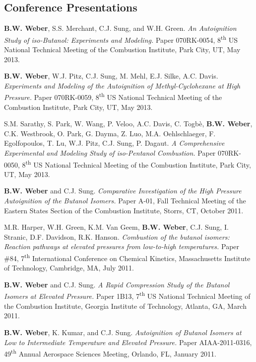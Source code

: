 \documentclass[margin,line]{res}
\newenvironment{list3}{
  \begin{list}{\ding{113}}{%
      \setlength{\itemsep}{0.1in}
      \setlength{\parsep}{0in} \setlength{\parskip}{0in}
      \setlength{\topsep}{0in} \setlength{\partopsep}{0in} 
      \setlength{\leftmargin}{0in}}}{\end{list}}
\begin{document}
\begin{resume}
\section{\sc Conference Presentations}
\begin{list3}
\item[] {\bf B.W. Weber}, S.S. Merchant, C.J. Sung, and W.H. Green. {\em An Autoignition Study of iso-Butanol: Experiments and Modeling.} Paper 070RK-0054, 8\textsuperscript{th} US National Technical Meeting of the Combustion Institute, Park City, UT, May 2013.
\item[] {\bf B.W. Weber}, W.J. Pitz, C.J. Sung, M. Mehl, E.J. Silke, A.C. Davis. {\em Experiments and Modeling of the Autoignition of Methyl-Cyclohexane at High Pressure.} Paper 070RK-0059, 8\textsuperscript{th} US National Technical Meeting of the Combustion Institute, Park City, UT, May 2013.
\item[] S.M. Sarathy, S. Park, W. Wang, P. Veloo, A.C. Davis, C. Togb\`{e}, {\bf B.W. Weber}, C.K. Westbrook, O. Park, G. Dayma, Z. Luo, M.A. Oehlschlaeger, F. Egolfopoulos, T. Lu, W.J. Pitz, C.J. Sung, P. Dagaut. {\em A Comprehensive Experimental and Modeling Study of iso-Pentanol Combustion.} Paper 070RK-0050, 8\textsuperscript{th} US National Technical Meeting of the Combustion Institute, Park City, UT, May 2013.
\item[] {\bf B.W. Weber} and C.J. Sung. {\em Comparative Investigation of the High Pressure Autoignition of the Butanol Isomers.} Paper A-01, Fall Technical Meeting of the Eastern States Section of the Combustion Institute, Storrs, CT, October 2011.
\item[] M.R. Harper, W.H. Green, K.M. Van Geem, {\bf B.W. Weber}, C.J. Sung, I. Stranic, D.F. Davidson,  R.K. Hanson. {\em Combustion of the butanol isomers: Reaction pathways at elevated pressures from low-to-high temperatures.} Paper \#84, 7\textsuperscript{th} International Conference on Chemical Kinetics, Massachusetts Institute of Technology, Cambridge, MA, July 2011.
\item[] {\bf B.W. Weber} and C.J. Sung. {\em A Rapid Compression Study of the Butanol Isomers at Elevated Pressure.} Paper 1B13, 7\textsuperscript{th} US National Technical Meeting of the Combustion Institute, Georgia Institute of Technology, Atlanta, GA, March 2011.
\item[] {\bf B.W. Weber}, K. Kumar, and C.J. Sung. {\em Autoignition of Butanol Isomers at Low to Intermediate Temperature and Elevated Pressure.} Paper AIAA-2011-0316, 49\textsuperscript{th} Annual Aerospace Sciences Meeting, Orlando, FL, January 2011.

\end{list3}
\end{resume}
\end{document}
